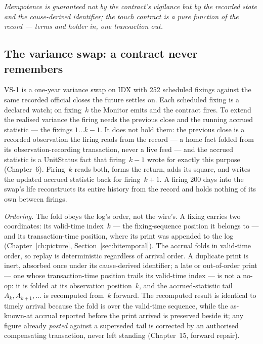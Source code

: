 \emph{Idempotence is guaranteed not by the contract's vigilance but by the
recorded state and the cause-derived identifier; the touch contract is a pure
function of the record --- terms and holder in, one transaction out.}

\subsection{The variance swap: a contract never remembers}

VS-1 is a one-year variance swap on IDX with 252 scheduled fixings against the
same recorded official closes the future settles on. Each scheduled fixing is a
declared watch; on fixing~$k$ the Monitor emits and the contract fires. To
extend the realised variance the firing needs the previous close and the running
accrued statistic --- the fixings $1 \ldots k-1$. It does not hold them: the
previous close is a recorded observation the firing reads from the record --- a
home fact folded from its observation-recording transaction, never a live feed ---
and the accrued statistic is a UnitStatus fact that firing~$k-1$ wrote for exactly
this purpose (Chapter~6).
Firing~$k$ reads both, forms the return, adds its square, and writes the updated
accrued statistic back for firing~$k+1$. A firing 200 days into the swap's life
reconstructs its entire history from the record and holds nothing of its own
between firings.

\emph{Ordering.} The fold obeys the log's order, not the wire's. A fixing carries
two coordinates: its valid-time index~$k$ --- the fixing-sequence position it
belongs to --- and its transaction-time position, where its print was appended to
the log (Chapter~\ref{ch:picture}, Section~\ref{sec:bitemporal}). The accrual folds
in valid-time order, so replay is deterministic regardless of arrival order. A
duplicate print is inert, absorbed once under its cause-derived identifier; a late
or out-of-order print --- one whose transaction-time position trails its valid-time
index --- is not a no-op: it is folded at its observation position~$k$, and the
accrued-statistic tail $A_k, A_{k+1}, \ldots$ is recomputed from~$k$ forward. The
recomputed result is identical to timely arrival because the fold is over the
valid-time sequence, while the as-known-at accrual reported before the print
arrived is preserved beside it; any figure already \emph{posted} against a superseded tail
is corrected by an authorised compensating transaction, never left standing
(Chapter~15, forward repair).

